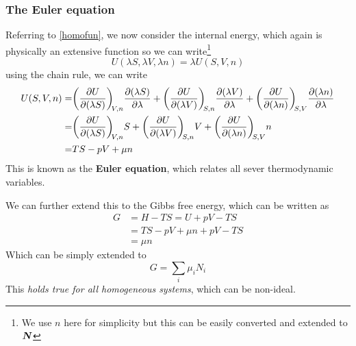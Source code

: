 \subsubsection{The Euler equation}
Referring to \cref{homofun}, we now consider the internal energy, which again is physically an extensive function so we can write\footnote{We use $n$ here for simplicity but this can be easily converted and extended to $\boldsymbol{N}$}
\begin{equation}
  U(\lambda S,\lambda V,\lambda n)=\lambda U(S,V,n)
\end{equation}
using the chain rule, we can write
\begin{equation}
\begin{aligned}
  U(S,V,n)=&\diffp{U}{(\lambda S)}[V,n]\diffp{(\lambda S)}{\lambda}+\diffp{U}{(\lambda V)}[S,n]\diffp{(\lambda V)}{\lambda}+\diffp{U}{(\lambda n)}[S,V]\diffp{(\lambda n)}{\lambda}\\
  =&\diffp{U}{(\lambda S)}[V,n]S+\diffp{U}{(\lambda V)}[S,n]V+\diffp{U}{(\lambda n)}[S,V]n\\
  =&TS-pV+\mu n
\end{aligned}
\end{equation}
This is known as the \textbf{Euler equation}, which relates all sever thermodynamic variables.\par
We can further extend this to the Gibbs free energy, which can be written as 
\begin{equation}
\begin{aligned}
G&=H-TS=U+pV-TS\\
&=TS-pV+\mu n+pV-TS\\
&=\mu n
\end{aligned}
\end{equation}
Which can be simply extended to
\begin{equation}
  G=\sum_i\mu_iN_i
\end{equation}
This \emph{holds true for all homogeneous systems}, which can be non-ideal.
